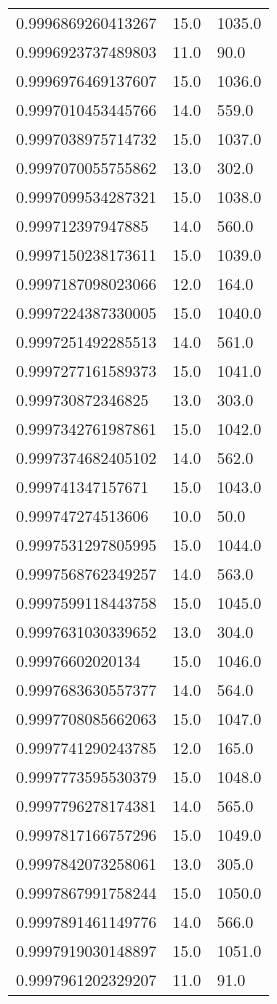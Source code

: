 \begin{center}
\begin{supertabular}[H]{p{0.30\textwidth}p{0.05\textwidth}p{0.05\textwidth}}
0.9996869260413267 & 15.0 & 1035.0 \\ 
0.9996923737489803 & 11.0 & 90.0 \\ 
0.9996976469137607 & 15.0 & 1036.0 \\ 
0.9997010453445766 & 14.0 & 559.0 \\ 
0.9997038975714732 & 15.0 & 1037.0 \\ 
0.9997070055755862 & 13.0 & 302.0 \\ 
0.9997099534287321 & 15.0 & 1038.0 \\ 
0.999712397947885 & 14.0 & 560.0 \\ 
0.9997150238173611 & 15.0 & 1039.0 \\ 
0.9997187098023066 & 12.0 & 164.0 \\ 
0.9997224387330005 & 15.0 & 1040.0 \\ 
0.9997251492285513 & 14.0 & 561.0 \\ 
0.9997277161589373 & 15.0 & 1041.0 \\ 
0.999730872346825 & 13.0 & 303.0 \\ 
0.9997342761987861 & 15.0 & 1042.0 \\ 
0.9997374682405102 & 14.0 & 562.0 \\ 
0.999741347157671 & 15.0 & 1043.0 \\ 
0.999747274513606 & 10.0 & 50.0 \\ 
0.9997531297805995 & 15.0 & 1044.0 \\ 
0.9997568762349257 & 14.0 & 563.0 \\ 
0.9997599118443758 & 15.0 & 1045.0 \\ 
0.9997631030339652 & 13.0 & 304.0 \\ 
0.99976602020134 & 15.0 & 1046.0 \\ 
0.9997683630557377 & 14.0 & 564.0 \\ 
0.9997708085662063 & 15.0 & 1047.0 \\ 
0.9997741290243785 & 12.0 & 165.0 \\ 
0.9997773595530379 & 15.0 & 1048.0 \\ 
0.9997796278174381 & 14.0 & 565.0 \\ 
0.9997817166757296 & 15.0 & 1049.0 \\ 
0.9997842073258061 & 13.0 & 305.0 \\ 
0.9997867991758244 & 15.0 & 1050.0 \\ 
0.9997891461149776 & 14.0 & 566.0 \\ 
0.9997919030148897 & 15.0 & 1051.0 \\ 
0.9997961202329207 & 11.0 & 91.0 \\ 

\end{supertabular}
\end{center}
